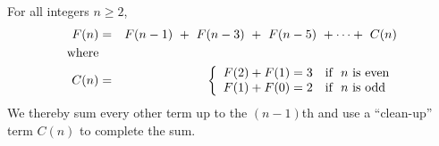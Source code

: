 \begin{prop}
\label{thm:FiboSum-2}
For all integers $n \geq 2$,
\begin{eqnarray}
\label{eq:multilinear-Fib-2}
F(n) & = &
F(n-1) \ + \ F(n-3) \ + \ F(n-5) \ + \cdots + \ C(n) \\
\nonumber
\mbox{where} &   & \\
\nonumber
C(n) & = & \left\{
\begin{array}{cl}
F(2) + F(1) = 3  & \mbox{\rm if } \ n \ \mbox{\rm is even} \\
F(1) + F(0) = 2  & \mbox{\rm if } \ n \ \mbox{\rm is odd}
\end{array}
\right.
\end{eqnarray}
We thereby sum every other term up to the $(n-1)$th and use a
``clean-up'' term $C(n)$ to complete the sum.
\end{prop}

